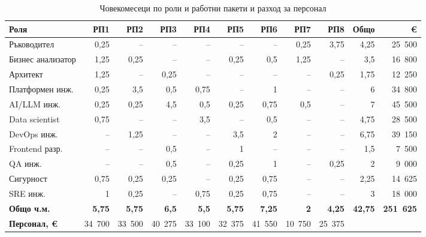 \documentclass[11pt,a4paper]{article}
\begin{document}
{\small\setlength{\tabcolsep}{4.2pt}
\begin{table}[H]\centering
\caption{Човекомесеци по роли и работни пакети и разход за персонал}\label{tab:pm}
\begin{tabular}{@{}lrrrrrrrrrr@{}}
\toprule
\textbf{Роля} & \textbf{РП1} & \textbf{РП2} & \textbf{РП3} & \textbf{РП4} & \textbf{РП5} & \textbf{РП6} & \textbf{РП7} & \textbf{РП8} & \textbf{Общо} & \textbf{\euro{}}\\
\midrule
Ръководител & 0,25 & -- & -- & -- & -- & -- & 0,25 & 3,75 & 4,25 & 25~500\\
Бизнес анализатор & 1,25 & 0,25 & -- & -- & 0,25 & 0,5 & 1,25 & -- & 3,5 & 16~800\\
Архитект & 1,25 & -- & 0,25 & -- & -- & -- & -- & 0,25 & 1,75 & 12~250\\
Платформен инж. & 0,25 & 3,5 & 0,5 & 0,75 & -- & 1 & -- & -- & 6 & 34~800\\
AI/LLM инж. & 0,25 & 0,25 & 4,5 & 0,5 & 0,25 & 0,75 & 0,5 & -- & 7 & 45~500\\
Data scientist & 0,75 & -- & -- & 3,5 & -- & 0,5 & -- & -- & 4,75 & 28~500\\
DevOps инж. & -- & 1,25 & -- & -- & 3,5 & 2 & -- & -- & 6,75 & 39~150\\
Frontend разр. & -- & -- & 0,5 & -- & 1 & -- & -- & -- & 1,5 & 7~500\\
QA инж. & -- & -- & 0,5 & -- & 0,25 & 1 & -- & 0,25 & 2 & 9~000\\
Сигурност & 0,75 & 0,25 & 0,25 & -- & 0,25 & 0,75 & -- & -- & 2,25 & 14~625\\
SRE инж. & 1 & 0,25 & -- & 0,75 & 0,25 & 0,75 & -- & -- & 3 & 18~000\\
\midrule
\textbf{Общо ч.м.} & \textbf{5,75} & \textbf{5,75} & \textbf{6,5} & \textbf{5,5} & \textbf{5,75} & \textbf{7,25} & \textbf{2} & \textbf{4,25} & \textbf{42,75} & \textbf{251~625}\\
\textbf{Персонал, \euro{}} & 34~700 & 33~500 & 40~275 & 33~100 & 32~375 & 41~550 & 10~750 & 25~375 & & \\
\bottomrule\end{tabular}\end{table}}
\end{document}
